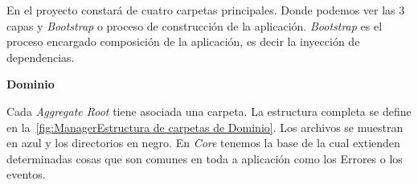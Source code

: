 En el proyecto constará de cuatro carpetas principales.
Donde podemos ver las 3 capas y \textit{Bootstrap} o proceso de construcción de la aplicación.
\textit{Bootstrap} es el proceso encargado composición de la aplicación, es decir la inyección de dependencias.


\textbf{Dominio}

Cada \textit{Aggregate Root} tiene asociada una carpeta.
La estructura completa se define en la~\cref{fig:ManagerEstructura de carpetas de Dominio}.
Los archivos se muestran en azul y los directorios en negro.
En \textit{Core} tenemos la base de la cual extienden determinadas cosas que son comunes en toda a aplicación como los Errores o los eventos.


